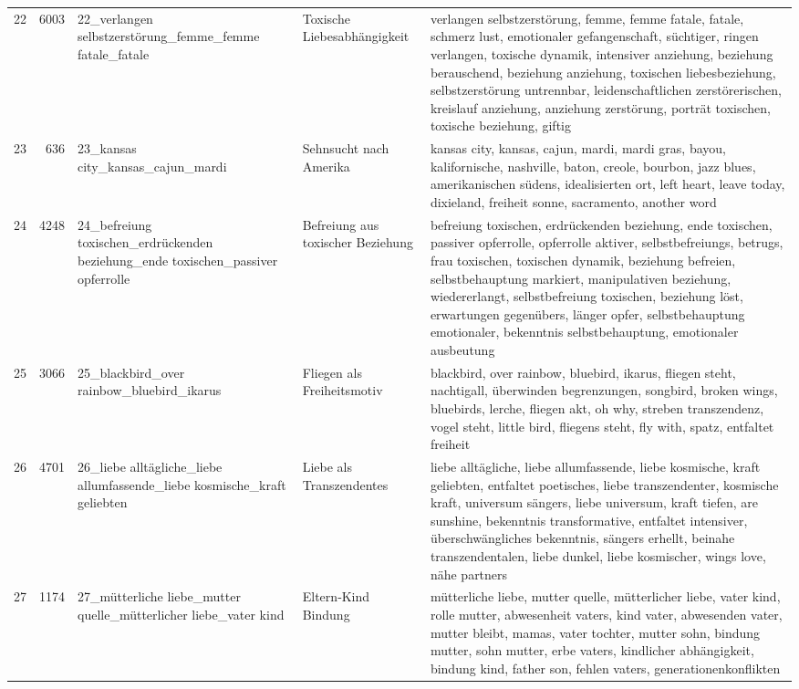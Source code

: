 \begin{longtable}{rrlll}
22 & 6003 & 22\_verlangen selbstzerstörung\_femme\_femme fatale\_fatale & Toxische Liebesabhängigkeit & verlangen selbstzerstörung, femme, femme fatale, fatale, schmerz lust, emotionaler gefangenschaft, süchtiger, ringen verlangen, toxische dynamik, intensiver anziehung, beziehung berauschend, beziehung anziehung, toxischen liebesbeziehung, selbstzerstörung untrennbar, leidenschaftlichen zerstörerischen, kreislauf anziehung, anziehung zerstörung, porträt toxischen, toxische beziehung, giftig \\
23 & 636 & 23\_kansas city\_kansas\_cajun\_mardi & Sehnsucht nach Amerika & kansas city, kansas, cajun, mardi, mardi gras, bayou, kalifornische, nashville, baton, creole, bourbon, jazz blues, amerikanischen südens, idealisierten ort, left heart, leave today, dixieland, freiheit sonne, sacramento, another word \\
24 & 4248 & 24\_befreiung toxischen\_erdrückenden beziehung\_ende toxischen\_passiver opferrolle & Befreiung aus toxischer Beziehung & befreiung toxischen, erdrückenden beziehung, ende toxischen, passiver opferrolle, opferrolle aktiver, selbstbefreiungs, betrugs, frau toxischen, toxischen dynamik, beziehung befreien, selbstbehauptung markiert, manipulativen beziehung, wiedererlangt, selbstbefreiung toxischen, beziehung löst, erwartungen gegenübers, länger opfer, selbstbehauptung emotionaler, bekenntnis selbstbehauptung, emotionaler ausbeutung \\
25 & 3066 & 25\_blackbird\_over rainbow\_bluebird\_ikarus & Fliegen als Freiheitsmotiv  & blackbird, over rainbow, bluebird, ikarus, fliegen steht, nachtigall, überwinden begrenzungen, songbird, broken wings, bluebirds, lerche, fliegen akt, oh why, streben transzendenz, vogel steht, little bird, fliegens steht, fly with, spatz, entfaltet freiheit \\
26 & 4701 & 26\_liebe alltägliche\_liebe allumfassende\_liebe kosmische\_kraft geliebten & Liebe als Transzendentes & liebe alltägliche, liebe allumfassende, liebe kosmische, kraft geliebten, entfaltet poetisches, liebe transzendenter, kosmische kraft, universum sängers, liebe universum, kraft tiefen, are sunshine, bekenntnis transformative, entfaltet intensiver, überschwängliches bekenntnis, sängers erhellt, beinahe transzendentalen, liebe dunkel, liebe kosmischer, wings love, nähe partners \\
27 & 1174 & 27\_mütterliche liebe\_mutter quelle\_mütterlicher liebe\_vater kind & Eltern‑Kind Bindung & mütterliche liebe, mutter quelle, mütterlicher liebe, vater kind, rolle mutter, abwesenheit vaters, kind vater, abwesenden vater, mutter bleibt, mamas, vater tochter, mutter sohn, bindung mutter, sohn mutter, erbe vaters, kindlicher abhängigkeit, bindung kind, father son, fehlen vaters, generationenkonflikten \\

\end{longtable}
